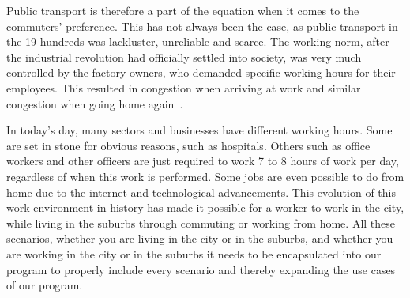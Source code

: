 Public transport is therefore a part of the equation when it comes to the commuters' preference.
This has not always been the case, as public transport in the 19 hundreds was lackluster, unreliable and scarce.
The working norm, after the industrial revolution had officially settled into society, was very much controlled by the
factory owners, who demanded specific working hours for their employees.
This resulted in congestion when arriving at work and similar congestion when going home again~\cite{bek2022}.

In today's day, many sectors and businesses have different working hours.
Some are set in stone for obvious reasons, such as hospitals.
Others such as office workers and other officers are just required to work 7 to 8 hours of work per day, regardless of
when this work is performed.
Some jobs are even possible to do from home due to the internet and technological advancements.
This evolution of this work environment in history has made it possible for a worker to work in the city, while living
in the suburbs through commuting or working from home.
All these scenarios, whether you are living in the city or in the suburbs, and whether you are working in the city or
in the suburbs it needs to be encapsulated into our program to properly include every scenario and thereby expanding the
use cases of our program.

